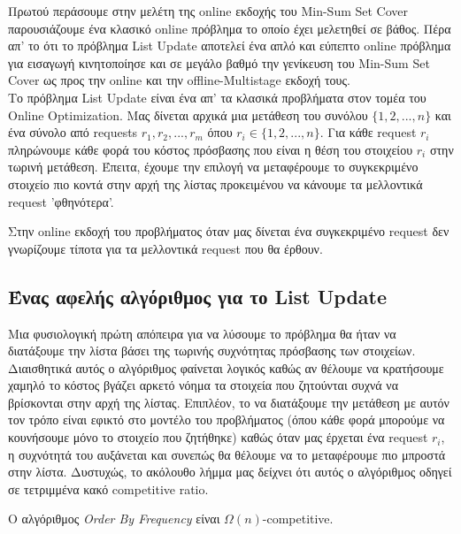 Πρωτού περάσουμε στην μελέτη της online εκδοχής του Min-Sum Set Cover παρουσιάζουμε ένα κλασικό online πρόβλημα το οποίο έχει μελετηθεί σε βάθος. Πέρα απ' το ότι το πρόβλημα List Update αποτελεί ένα απλό και εύπεπτο online πρόβλημα για εισαγωγή κινητοποίησε και σε μεγάλο βαθμό την γενίκευση του Min-Sum Set Cover ως προς την online και την offline-Multistage εκδοχή τους. \\

Το πρόβλημα List Update είναι ένα απ' τα κλασικά προβλήματα στον τομέα του Online Optimization. Μας δίνεται αρχικά μια μετάθεση του συνόλου $\{ 1,2, ...,n \}$ και ένα σύνολο από requests $r_1, r_2, ..., r_m$ όπου $r_i \in \{ 1,2,...,n \}$. Για κάθε request $r_i$ πληρώνουμε κάθε φορά του κόστος πρόσβασης που είναι η θέση του στοιχείου $r_i$ στην τωρινή μετάθεση. Έπειτα, έχουμε την επιλογή να μεταφέρουμε το συγκεκριμένο στοιχείο πιο κοντά στην αρχή της λίστας προκειμένου να κάνουμε τα μελλοντικά request 'φθηνότερα'.

Στην online εκδοχή του προβλήματος όταν μας δίνεται ένα συγκεκριμένο request δεν γνωρίζουμε τίποτα για τα μελλοντικά request που θα έρθουν.

\subsection{Ένας αφελής αλγόριθμος για το List Update}

Μια φυσιολογική πρώτη απόπειρα για να λύσουμε το πρόβλημα θα ήταν να διατάξουμε την λίστα βάσει της τωρινής συχνότητας πρόσβασης των στοιχείων. Διαισθητικά αυτός ο αλγόριθμος φαίνεται λογικός καθώς αν θέλουμε να κρατήσουμε χαμηλό το κόστος βγάζει αρκετό νόημα τα στοιχεία που ζητούνται συχνά να βρίσκονται στην αρχή της λίστας. Επιπλέον, το να διατάξουμε την μετάθεση με αυτόν τον τρόπο είναι εφικτό στο μοντέλο του προβλήματος (όπου κάθε φορά μπορούμε να κουνήσουμε μόνο το στοιχείο που ζητήθηκε) καθώς όταν μας έρχεται ένα request $r_i$, η συχνότητά του αυξάνεται και συνεπώς θα θέλουμε να το μεταφέρουμε πιο μπροστά στην λίστα. Δυστυχώς, το ακόλουθο λήμμα μας δείχνει ότι αυτός ο αλγόριθμος οδηγεί σε τετριμμένα κακό competitive ratio.

\begin{λήμμα}\label{l:frequency_bad}
    Ο αλγόριθμος \emph{Order By Frequency} είναι $\Omega( n )$-competitive.
\end{λήμμα}

